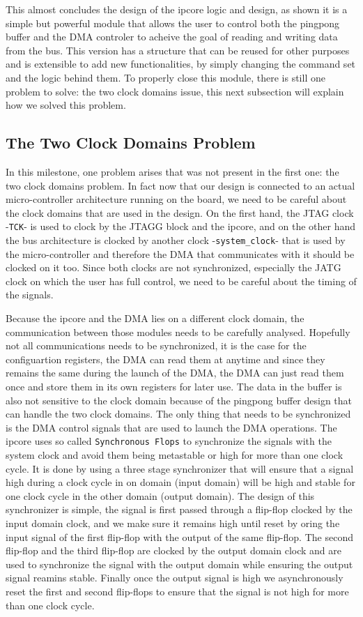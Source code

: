 \documentclass[a4paper,11pt,oneside]{report}
\begin{document}
This almost concludes the design of the ipcore logic and design, as shown it is a simple but 
powerful module that allows the user to control both the pingpong buffer and the DMA controler to acheive the goal of reading and writing data from the bus.
This version has a structure that can be reused for other purposes and is extensible to add new functionalities, by simply changing the command set and the logic 
behind them.
To properly close this module, there is still one problem to solve: the two clock domains issue, this next subsection will explain how we solved this problem.

\subsection{The Two Clock Domains Problem}

In this milestone, one problem arises that was not present in the first one: the two clock domains problem. In fact now that our design is connected to 
an actual micro-controller architecture running on the board, we need to be careful about the clock domains that are used in the design.
On the first hand, the JTAG clock -\texttt{TCK}- is used to clock by the JTAGG block and the ipcore, and on the other hand the bus architecture 
is clocked by another clock -\texttt{system\_clock}- that is used by the micro-controller and therefore the DMA that communicates with it should be clocked on it too.
Since both clocks are not synchronized, especially the JATG clock on which the user has full control, we need to be careful about the timing of the signals.

Because the ipcore and the DMA lies on a different clock domain, the communication between those modules needs to be carefully analysed.
Hopefully not all communications needs to be synchronized, it is the case for the configuartion registers, the DMA can read them at anytime and since they remains the same 
during the launch of the DMA, the DMA can just read them once and store them in its own registers for later use.
The data in the buffer is also not sensitive to the clock domain because of the pingpong buffer design that can handle the two clock domains.
The only thing that needs to be synchronized is the DMA control signals that are used to launch the DMA operations.
The ipcore uses so called \texttt{Synchronous Flops} to synchronize the signals with the system clock and avoid them being metastable or high for more than one clock cycle.
It is done by using a three stage synchronizer that will ensure that a signal high during a clock cycle in on domain (input domain) will be high and stable for one clock cycle in the other domain (output domain).
The design of this synchronizer is simple, the signal is first passed through a flip-flop clocked by the input domain clock, and we make sure it remains high until reset by oring the 
input signal of the first flip-flop with the output of the same flip-flop.
The second flip-flop and the third flip-flop are clocked by the output domain clock and are used to synchronize the signal with the output domain while ensuring the output signal reamins stable.
Finally once the output signal is high we asynchronously reset the first and second flip-flops to ensure that the signal is not high for more than one clock cycle.
\end{document}
